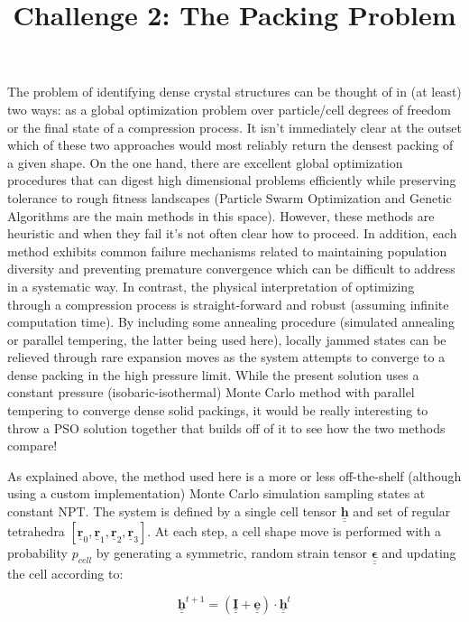 \documentclass[12pt,a4paper]{article}
\title{Challenge 2: The Packing Problem}
\begin{document}
 
\maketitle

The problem of identifying dense crystal structures can be thought of in (at least) two ways: as a global optimization problem over particle/cell degrees of freedom or the final state of a compression process. It isn't immediately clear at the outset which of these two approaches would most reliably return the densest packing of a given shape. On the one hand, there are excellent global optimization procedures that can digest high dimensional problems efficiently while preserving tolerance to rough fitness landscapes (Particle Swarm Optimization and Genetic Algorithms are the main methods in this space). However, these methods are heuristic and when they fail it's not often clear how to proceed. In addition, each method exhibits common failure mechanisms related to maintaining population diversity and preventing premature convergence which can be difficult to address in a systematic way. In contrast, the physical interpretation of optimizing through a compression process is straight-forward and robust (assuming infinite computation time). By including some annealing procedure (simulated annealing or parallel tempering, the latter being used here), locally jammed states can be relieved through rare expansion moves as the system attempts to converge to a dense packing in the high pressure limit. While the present solution uses a constant pressure (isobaric-isothermal) Monte Carlo method with parallel tempering to converge dense solid packings, it would be really interesting to throw a PSO solution together that builds off of it to see how the two methods compare!

As explained above, the method used here is a more or less off-the-shelf (although using a custom implementation) Monte Carlo  simulation sampling states at constant NPT. The system is defined by a single cell tensor $\underline{\underline{\mathbf{h}}}$ and set of regular tetrahedra $[\underline{\mathbf{r}}_0,\underline{\mathbf{r}}_1,\underline{\mathbf{r}}_2,\underline{\mathbf{r}}_3]$. At each step, a cell shape move is performed with a probability $p_{cell}$ by generating a symmetric, random strain tensor $\underline{\underline{\mathbf{\epsilon}}}$ and updating the cell according to:

$$ \underline{\underline{\mathbf{h}}}^{t+1} = \left( \underline{\underline{\mathbf{I}}} +  \underline{\underline{\mathbf{e}}} \right) \cdot  \underline{\underline{\mathbf{h}}}^{t}$$
\end{document}
